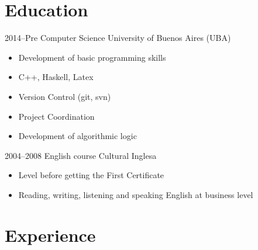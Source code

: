 \documentclass[]{cv-style}
\begin{document}

\section{Education}

\begin{entrylist}
\entry
{2014--Pre}
{Computer Science}
{University of Buenos Aires (UBA)}
{
\begin{itemize}
\item Development of basic programming skills
\item C++, Haskell, Latex
\item Version Control (git, svn)
\item Project Coordination
\item Development of algorithmic logic
\end{itemize}}

{\vspace{-0.3cm}}
\end{entrylist}
\begin{entrylist}
\entry
{2004--2008}
{English course}
{Cultural Inglesa}
{
\begin{itemize}
\item Level before getting the First Certificate
\item Reading, writing, listening and speaking English at business level 
\end{itemize}}

\end{entrylist}


\section{Experience}
\end{document}

